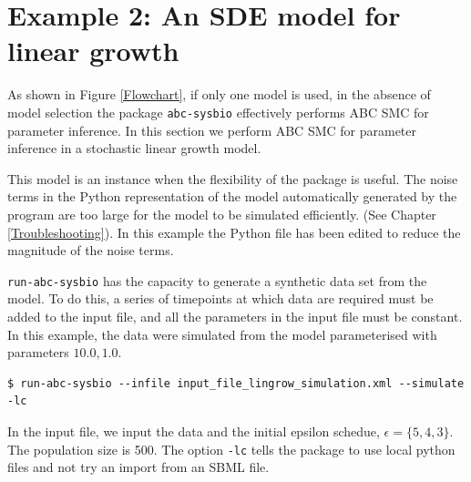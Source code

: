\documentclass[a4paper]{report}
\begin{document}
\newpage
\newpage

\section{Example 2: An SDE model for linear growth}
As shown in Figure \ref{Flowchart}, if only one model is used, in the absence of model selection the package \verb$abc-sysbio$ effectively performs ABC SMC for parameter inference. In this section we perform ABC SMC for parameter inference in a stochastic linear growth model. 

This model is an instance when the flexibility of the package is useful. The noise terms in the Python representation of the model automatically generated by the program are too large for the model to be simulated efficiently. (See Chapter \ref{Troubleshooting}). In this example the Python file has been edited to reduce the magnitude of the noise terms. 

\verb$run-abc-sysbio$ has the capacity to generate a synthetic data set from the model. To do this, a series of timepoints at which data are required must be added to the input file, and all the parameters in the input file must be constant. In this example, the data were simulated from the model parameterised with parameters $10.0, 1.0$.
\begin{verbatim}
$ run-abc-sysbio --infile input_file_lingrow_simulation.xml --simulate -lc
\end{verbatim}
In the input file, we input the data and the initial epsilon schedue, $\epsilon = \{5, 4, 3\}$. The population size is 500. The option \verb$-lc$ tells the package to use local python files and not try an import from an SBML file.
\end{document}
